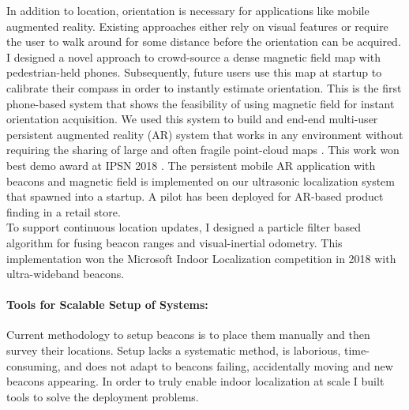 \documentclass[10pt]{article}
\begin{document}
In addition to location, %
orientation is necessary for applications like mobile
augmented reality. Existing approaches either rely on visual features
or require the user to walk around for some distance before the
orientation can be acquired.
I designed a novel approach to crowd-source a dense magnetic field
map with pedestrian-held phones. Subsequently, future users use this map at startup to calibrate
their compass in order to instantly estimate orientation. %
This is the first phone-based system that shows the feasibility of using magnetic field for instant orientation acquisition. %
We used
this system to build and end-end multi-user persistent augmented
reality (AR) system that works in any environment without requiring the
sharing of large and often fragile point-cloud maps \cite{mobileAR}. This work won best demo award at IPSN 2018 \cite{rajagopal2018welcome}. The persistent mobile AR application with beacons and magnetic field is implemented on our ultrasonic localization system that spawned into a startup. A pilot has been deployed for AR-based product finding in a retail store. \\

To support continuous location updates, I designed a particle filter based algorithm for fusing beacon ranges and visual-inertial odometry. This implementation won the Microsoft Indoor Localization competition in 2018 with ultra-wideband beacons.

\paragraph{Tools for Scalable Setup of Systems: }
Current methodology to setup beacons is to place them manually and then survey their locations. 
Setup lacks a systematic method, is laborious, time-consuming, and does not adapt to beacons failing, accidentally moving and new beacons appearing. In order to truly enable indoor localization at scale I built tools to solve the deployment problems.
\end{document}
